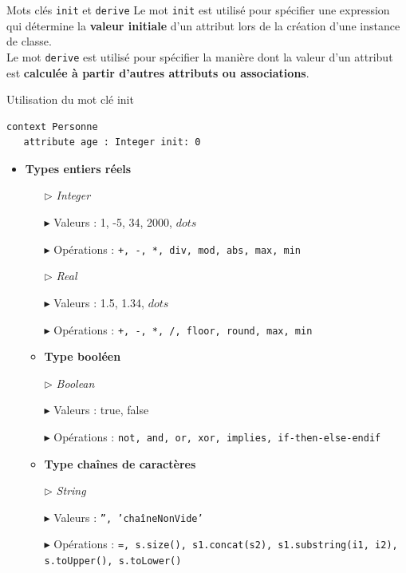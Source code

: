 \documentclass[16pt]{report}
\begin{document}
\begin{multicols*}{2}
    \begin{Definitionx}{Mots clés \texttt{init} et \texttt{derive}    }{}
        Le mot \texttt{init} est utilisé pour spécifier une expression qui détermine la \textbf{valeur initiale} 
        d'un attribut lors de la création d'une instance de classe. 
        \vspace{1em} \\ 
        Le mot \texttt{derive} est utilisé pour spécifier la manière dont la valeur d'un attribut
        est \textbf{calculée à partir d'autres attributs ou associations}.   
    \end{Definitionx}

    \begin{EExample}{Utilisation du mot clé init}{}
        \begin{lstlisting}
context Personne
   attribute age : Integer init: 0
        \end{lstlisting}
    \end{EExample}

    \begin{itemize}
        \item \textbf{Types entiers réels}
            \begin{itemize}
                \item[$\rhd$] \textit{\textcolor{myb}{Integer}} 
                \item[$\blacktriangleright$] Valeurs : 1, -5, 34, 2000, $dots$ 
                \item[$\blacktriangleright$] Opérations : \texttt{+, -, *, div, mod, abs, max, min}  
                \item[$\rhd$] \textit{\textcolor{myb}{Real}} 
                \item[$\blacktriangleright$] Valeurs : 1.5, 1.34, $dots$ 
                \item[$\blacktriangleright$] Opérations : \texttt{+, -, *, /, floor, round, max, min}  
            \item \textbf{Type booléen}  
                \item[$\rhd$] \textit{\textcolor{myb}{Boolean}} 
                \item[$\blacktriangleright$] Valeurs : true, false 
                \item[$\blacktriangleright$] Opérations : \texttt{not, and, or, xor, implies, if-then-else-endif}  
            \item \textbf{Type chaînes de caractères}
                 \item[$\rhd$] \textit{\textcolor{myb}{String}} 
                \item[$\blacktriangleright$] Valeurs : \texttt{'', 'chaîneNonVide'}   
                \item[$\blacktriangleright$] Opérations : \texttt{=, s.size(), s1.concat(s2), s1.substring(i1, i2), s.toUpper(), s.toLower()}  
            \end{itemize}
    \end{itemize}


\end{multicols*}
\end{document}
